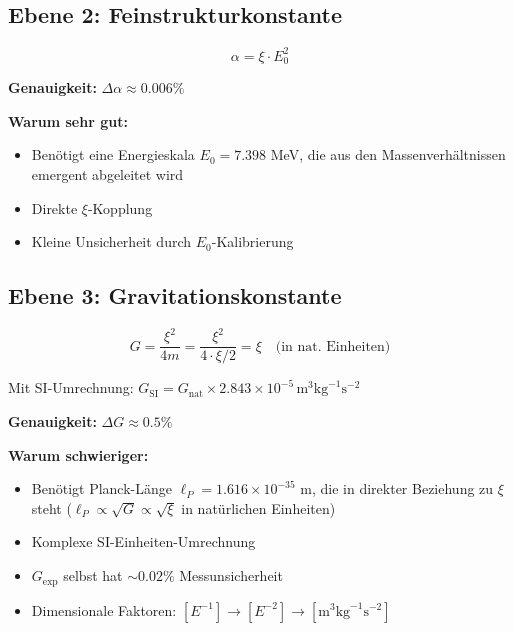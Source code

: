 	\subsection{Ebene 2: Feinstrukturkonstante}
	
	\begin{equation}
		\alpha = \xi \cdot E_0^2
	\end{equation}
	
	\begin{tcolorbox}[colback=blue!5!white,colframe=blue!75!black,title=Semi-reine $\xi$-Form]
		\textbf{Genauigkeit:} $\Delta \alpha \approx 0.006\%$
		
		\textbf{Warum sehr gut:}
		\begin{itemize}
			\item Benötigt eine Energieskala $E_0 = 7.398$ MeV, die aus den Massenverhältnissen emergent abgeleitet wird
			\item Direkte $\xi$-Kopplung
			\item Kleine Unsicherheit durch $E_0$-Kalibrierung
		\end{itemize}
	\end{tcolorbox}
	
	\subsection{Ebene 3: Gravitationskonstante}
	
	\begin{equation}
		G = \frac{\xi^2}{4m} = \frac{\xi^2}{4 \cdot \xi/2} = \xi \quad \text{(in nat. Einheiten)}
	\end{equation}
	
	Mit SI-Umrechnung: $G_{\text{SI}} = G_{\text{nat}} \times 2.843 \times 10^{-5}\,\text{m}^3\text{kg}^{-1}\text{s}^{-2}$
	
	\begin{tcolorbox}[colback=yellow!5!white,colframe=orange!75!black,title=Komplexe $\xi$-Form]
		\textbf{Genauigkeit:} $\Delta G \approx 0.5\%$
		
		\textbf{Warum schwieriger:}
		\begin{itemize}
			\item Benötigt Planck-Länge $\ell_P = 1.616 \times 10^{-35}$ m, die in direkter Beziehung zu $\xi$ steht ($\ell_P \propto \sqrt{G} \propto \sqrt{\xi}$ in natürlichen Einheiten)
			\item Komplexe SI-Einheiten-Umrechnung
			\item $G_{\exp}$ selbst hat $\sim 0.02\%$ Messunsicherheit
			\item Dimensionale Faktoren: $[E^{-1}] \to [E^{-2}] \to [\text{m}^3\text{kg}^{-1}\text{s}^{-2}]$
		\end{itemize}
	\end{tcolorbox}
	
